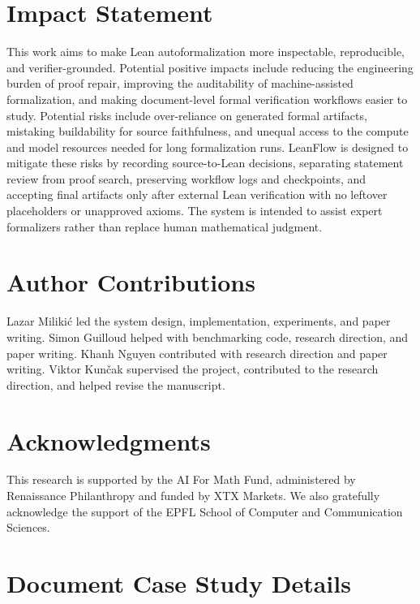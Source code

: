 \documentclass{article}
\newcommand{\method}{LeanFlow\xspace}
\newcommand{\lean}{Lean\xspace}
\begin{document}
\section*{Impact Statement}

This work aims to make \lean autoformalization more inspectable, reproducible, and verifier-grounded.
Potential positive impacts include reducing the engineering burden of proof repair, improving the auditability of machine-assisted formalization, and making document-level formal verification workflows easier to study.
Potential risks include over-reliance on generated formal artifacts, mistaking buildability for source faithfulness, and unequal access to the compute and model resources needed for long formalization runs.
\method is designed to mitigate these risks by recording source-to-\lean decisions, separating statement review from proof search, preserving workflow logs and checkpoints, and accepting final artifacts only after external \lean verification with no leftover placeholders or unapproved axioms.
The system is intended to assist expert formalizers rather than replace human mathematical judgment.

\section*{Author Contributions}

Lazar Miliki\'c led the system design, implementation, experiments, and paper writing.
Simon Guilloud helped with benchmarking code, research direction, and paper writing. 
Khanh Nguyen contributed with research direction and paper writing.
Viktor Kun\v{c}ak supervised the project, contributed to the research direction, and helped revise the manuscript.

\section*{Acknowledgments}

This research is supported by the AI For Math Fund, administered by Renaissance Philanthropy and funded by XTX Markets. We also gratefully acknowledge the support of the EPFL School of Computer and Communication Sciences.




\clearpage
\onecolumn
\appendix
\section{Document Case Study Details}
\label{app:case-studies}
\end{document}
